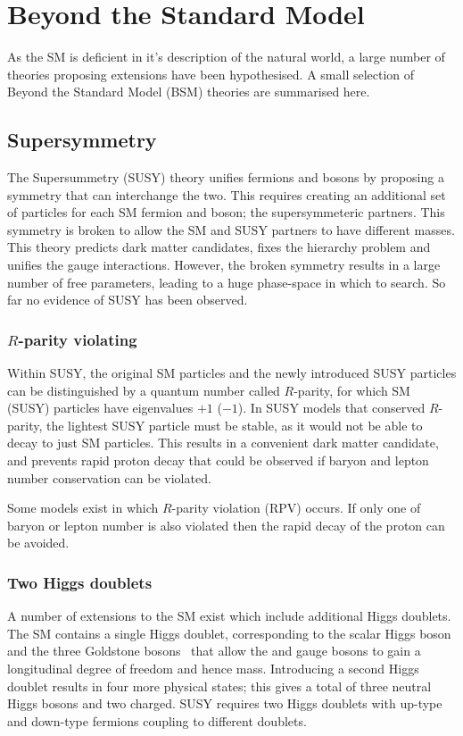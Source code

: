 \section{Beyond the Standard Model}
\label{sec:intro_BSM}
As the SM is deficient in it's description of the natural world, a large number of theories proposing extensions have been hypothesised.
A small selection of Beyond the Standard Model (BSM) theories are summarised here. 

\subsection{Supersymmetry}

The Supersummetry (SUSY) theory unifies fermions and bosons by proposing a symmetry that can interchange the two. This requires creating an additional set of particles for each SM fermion and boson; the supersymmeteric partners. This symmetry is broken to allow the SM and SUSY partners to have different masses. This theory predicts dark matter candidates, fixes the hierarchy problem and unifies the gauge interactions. 
However, the broken symmetry results in a large number of free parameters, leading to a huge phase-space in which to search. So far no evidence of SUSY has been observed.

\subsubsection{$R$-parity violating}

Within SUSY, the original SM particles and the newly introduced SUSY particles can be distinguished by a quantum number called $R$-parity, for which SM (SUSY) particles have eigenvalues $+1$ ($-1$). In SUSY models that conserved $R$-parity, the lightest SUSY particle must be stable, as it would not be able to decay to just SM particles. This results in a convenient dark matter candidate, and prevents rapid proton decay that could be observed if baryon and lepton number conservation can be violated. 

Some models exist in which $R$-parity violation (RPV) occurs. If only one of baryon or lepton number is also violated then the rapid decay of the proton can be avoided. 

\subsubsection{Two Higgs doublets}
A number of extensions to the SM exist which include additional Higgs doublets. The SM contains a single Higgs doublet, corresponding to the scalar Higgs boson and the three Goldstone bosons~\cite{PhysRev.117.648,Goldstone1961} that allow the \Wpm and \Z gauge bosons to gain a longitudinal degree of freedom and hence mass. Introducing a second Higgs doublet results in four more physical states; this gives a total of three neutral Higgs bosons and two charged. 
SUSY requires two Higgs doublets with up-type and down-type fermions coupling to different doublets.   

